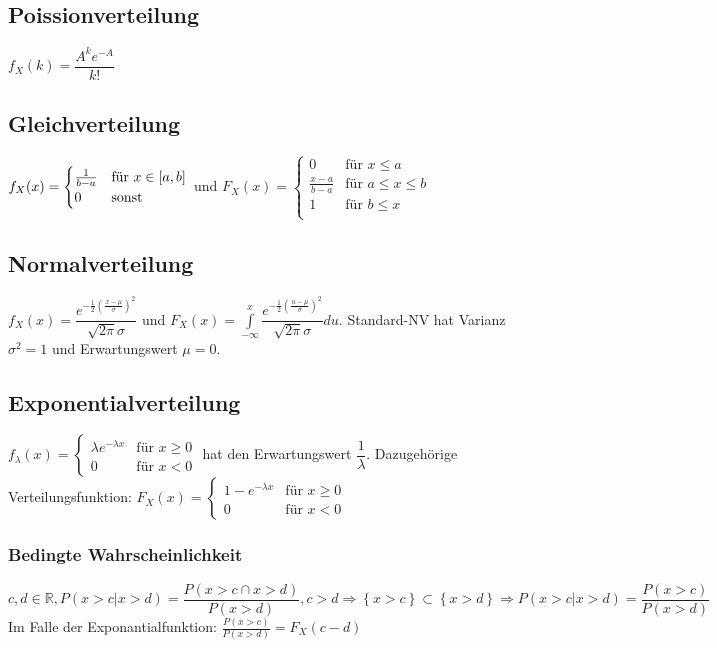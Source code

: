 \documentclass[10pt,a4paper]{article}
\begin{document}
\subsection{Poissionverteilung}
$f_X(k) = \dfrac{A^k e^{-A}}{k!}$

\subsection{Gleichverteilung}
$f_X(x) = \begin{cases}
1 \over {b-a} & \mbox{für } x \in \left[a,b\right] \\
0 & \mbox{sonst}
\end{cases}$ und
$F_X(x) = \begin{cases}
0 & \mbox{für } x \leq a \\
\frac{x-a}{b-a} & \mbox{für } a \leq x \leq b \\
1 & \mbox{für } b \leq x \\
\end{cases}$

\subsection{Normalverteilung}
$f_X(x)=\dfrac{e^{-\frac{1}{2} \left( \frac{x- \mu}{\sigma} \right)^2}}{\sqrt{2 \pi} \sigma}$ und
$F_X(x)=\int\limits_{-\infty}^x \dfrac{e^{-\frac{1}{2} \left( \frac{u- \mu}{\sigma} \right)^2}}{\sqrt{2 \pi} \sigma} du$. Standard-NV hat Varianz $\sigma^2 = 1$ und Erwartungswert $\mu = 0$.

\subsection{Exponentialverteilung}
$f_\lambda(x) =
\begin{cases}
\lambda e^{-\lambda x} & \mbox{für } x \geq 0 \\
0 & \mbox{für } x < 0
\end{cases}
$ hat den Erwartungswert $\dfrac{1}{\lambda}$. Dazugehörige Verteilungsfunktion: $F_X(x) = \begin{cases}
1-e^{-\lambda x} & \mbox{für } x \geq 0 \\
0 & \mbox{für } x < 0
\end{cases}$

\subsubsection{Bedingte Wahrscheinlichkeit}
\[c, d \in \mathbb{R},
P(x > c | x > d) = \dfrac{P(x>c \cap x > d)}{P(x > d)}, c>d \Rightarrow \left\{ x > c \right\} \subset
\left\{ x > d \right\} \Rightarrow P(x > c | x > d) = \dfrac{P(x>c)}{P(x > d)}\]
Im Falle der Exponantialfunktion: $\frac{P(x>c)}{P(x > d)} = F_X(c-d)$
\end{document}
